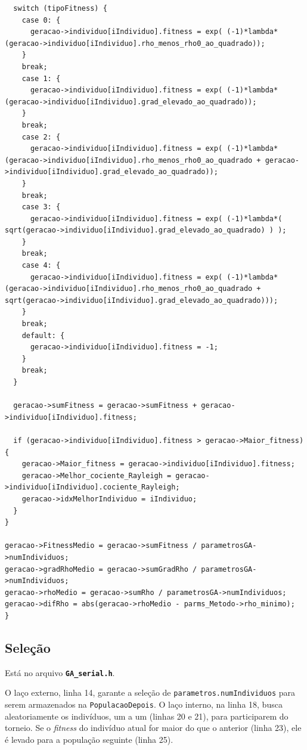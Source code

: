 \begin{lstlisting}
  switch (tipoFitness) {
    case 0: {
      geracao->individuo[iIndividuo].fitness = exp( (-1)*lambda*(geracao->individuo[iIndividuo].rho_menos_rho0_ao_quadrado));
    }
    break;
    case 1: {
      geracao->individuo[iIndividuo].fitness = exp( (-1)*lambda*(geracao->individuo[iIndividuo].grad_elevado_ao_quadrado));
    }
    break;
    case 2: {
      geracao->individuo[iIndividuo].fitness = exp( (-1)*lambda*(geracao->individuo[iIndividuo].rho_menos_rho0_ao_quadrado + geracao->individuo[iIndividuo].grad_elevado_ao_quadrado));
    }
    break;
    case 3: {
      geracao->individuo[iIndividuo].fitness = exp( (-1)*lambda*( sqrt(geracao->individuo[iIndividuo].grad_elevado_ao_quadrado) ) );
    }
    break;
    case 4: {
      geracao->individuo[iIndividuo].fitness = exp( (-1)*lambda*(geracao->individuo[iIndividuo].rho_menos_rho0_ao_quadrado + sqrt(geracao->individuo[iIndividuo].grad_elevado_ao_quadrado)));
    }
    break;
    default: {
      geracao->individuo[iIndividuo].fitness = -1;
    }
    break;
  }

  geracao->sumFitness = geracao->sumFitness + geracao->individuo[iIndividuo].fitness;

  if (geracao->individuo[iIndividuo].fitness > geracao->Maior_fitness) {
    geracao->Maior_fitness = geracao->individuo[iIndividuo].fitness;
    geracao->Melhor_cociente_Rayleigh = geracao->individuo[iIndividuo].cociente_Rayleigh;
    geracao->idxMelhorIndividuo = iIndividuo;
  }
}

geracao->FitnessMedio = geracao->sumFitness / parametrosGA->numIndividuos;
geracao->gradRhoMedio = geracao->sumGradRho / parametrosGA->numIndividuos;
geracao->rhoMedio = geracao->sumRho / parametrosGA->numIndividuos;
geracao->difRho = abs(geracao->rhoMedio - parms_Metodo->rho_minimo);
}
\end{lstlisting}
\vspace{1 cm}


\subsection{Seleção}

	Está no arquivo \textbf{\texttt{GA\_serial.h}}.
	
	O laço externo, linha 14, garante a seleção de \texttt{parametros.numIndividuos} para serem armazenados na \texttt{PopulacaoDepois}. O laço interno, na linha 18, busca aleatoriamente os indivíduos, um a um (linhas 20 e 21), para participarem do torneio. Se o \emph{fitness} do indivíduo atual for maior do que o anterior (linha 23), ele é levado para a população seguinte (linha 25).
	
